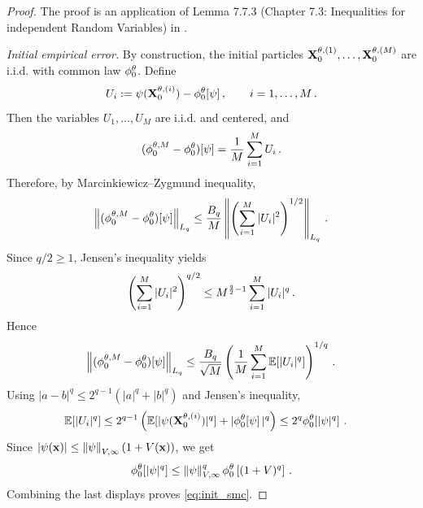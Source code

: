 \documentclass[11pt]{article}
\theoremstyle{plain}
\theoremstyle{definition}
\theoremstyle{remark}
\begin{document}
\begin{proof}
        The proof is an application of Lemma 7.7.3 (Chapter 7.3: Inequalities for independent Random Variables) in \citet{delmoral2004feynman}. 
        
\noindent\emph{Initial empirical error.}
By construction, the initial particles $\mathbf{X}_0^{\theta, (1)},\ldots,\mathbf{X}_0^{\theta, (M)}$ are i.i.d. with common law $\approxfilter{0}$. Define
$$
U_i
\eqdef
\psi(\X_0^{\theta, (i)})-\approxfilter{0}[\psi],
\qquad i = 1, \ldots , M \eqsp.
$$
Then the variables $U_1,\ldots,U_M$ are i.i.d. and centered, and
$$
(\mcfilter{0}-\approxfilter{0})[\psi]
=
\frac1M\sum_{i=1}^M U_i \eqsp .
$$
Therefore, by Marcinkiewicz--Zygmund inequality,
$$
\normEc{(\mcfilter{0}-\approxfilter{0})[\psi]}_{L_q}
\le
\frac{B_q}{M}
\normEc{
\left(\sum_{i=1}^M |U_i|^2\right)^{1/2}
}_{L_q} \eqsp.
$$
Since $q/2\ge 1$, Jensen's inequality yields
$$
\left(\sum_{i=1}^M |U_i|^2\right)^{q/2}
\le
M^{\frac q2-1}\sum_{i=1}^M |U_i|^q \,.
$$
Hence
$$
\normEc{(\mcfilter{0}-\approxfilter{0})[\psi]}_{L_q}
\le
\frac{B_q}{\sqrt M}
\left(
\frac1M\sum_{i=1}^M \E[|U_i|^q]
\right)^{1/q} \eqsp.
$$
Using $|a-b|^q\le 2^{q-1}(|a|^q+|b|^q)$ and Jensen's inequality,
\begin{align*}
\E[|U_i|^q] &\le 2^{q-1} \left( \E[|\psi(\X_0^{\theta,(i)})|^q] + |\approxfilter{0}[\psi]|^q \right) \le 2^q \approxfilter{0}[|\psi|^q] \eqsp.
\end{align*}
Since $|\psi(\mathbf{x})|\le \left\|\psi\right\|_{V,\infty} (1+ V (\mathbf{x}))$, we get
$$
\approxfilter{0}[|\psi|^q] \le \normEc{\psi}_{V,\infty}^q  \approxfilter{0} \left[(1+ V)^q \right] \eqsp.
$$
Combining the last displays proves \eqref{eq:init_smc}.
        

\end{proof}
\end{document}
